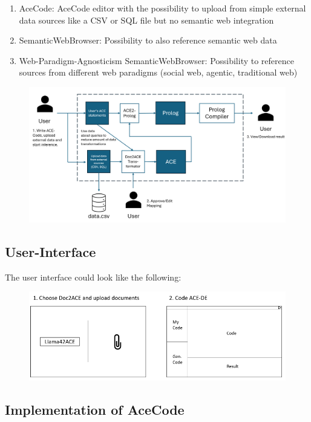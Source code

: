 \documentclass[12pt,a4paper]{article}
\begin{document}
\begin{enumerate}
    \item AceCode: AceCode editor with the possibility to upload from simple external data sources like a CSV or SQL file but no semantic web integration
    \item SemanticWebBrowser: Possibility to also reference semantic web data
    \item Web-Paradigm-Agnosticism SemanticWebBrowser: Possibility to reference sources from different web paradigms (social web, agentic, traditional web)
\end{enumerate}

\begin{figure}[h]
\includegraphics[width=16cm]{semantic_web_browser_first_stage_architecture}
\end{figure}

\subsection{User-Interface}

The user interface could look like the following:

\begin{figure}[h]
\includegraphics[width=16cm]{ui_mock}
\end{figure}

\subsection{Implementation of AceCode}
\end{document}
